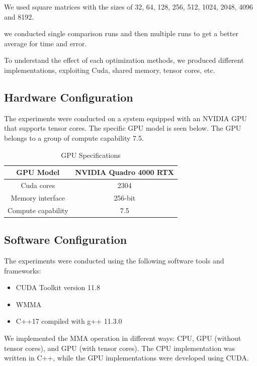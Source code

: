 \documentclass[conference]{IEEEtran}
\begin{document}
  We used square matrices with the sizes of 32, 64, 128, 256, 512, 1024, 2048, 4096 and 8192.

  we conducted single comparison runs and then multiple runs to get a better average for time and error.
  
  To understand the effect of each optimization methods, we produced different implementations, exploiting 
  Cuda, shared memory, tensor cores, etc.

  \subsection{Hardware Configuration}\label{sec:hardware-configuration}
  
  The experiments were conducted on a system equipped with an NVIDIA GPU that supports tensor cores.
  The specific GPU model is seen below. The GPU belongs to a group of compute capability 7.5. 
  
  \begin{table}[htbp]
  \caption{GPU Specifications\cite{Voltatuningguide}}
  \centering
    \begin{tabular}{|c|c|}
    \hline
    GPU Model & NVIDIA Quadro 4000 RTX \\
    \hline
    Cuda cores & 2304 \\
    \hline
    Memory interface & 256-bit \\
    \hline
    Compute capability & 7.5 \\
    \hline
    
  \end{tabular}
  \end{table}
  
  \subsection{Software Configuration}\label{sec:software-configuration}
  
  The experiments were conducted using the following software tools and frameworks:
  
  \begin{itemize}
    \item CUDA Toolkit version 11.8
    \item WMMA
    \item C++17 compiled with g++ 11.3.0
  \end{itemize}
  
  We implemented the MMA operation in different ways: CPU, GPU (without tensor cores), and GPU (with tensor cores). 
  The CPU implementation was written in C++, while the GPU implementations were developed using CUDA.
\end{document}
